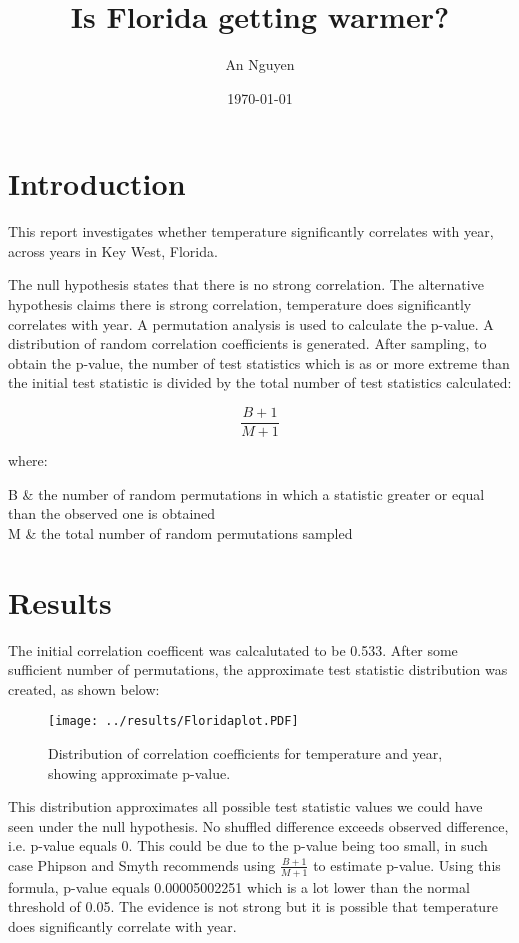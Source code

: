 \documentclass[12pt]{article}
\title{Is Florida getting warmer?}
\author{An Nguyen}
\date{\today}
\makeatletter
\newenvironment{conditions*}
  {\par\vspace{\abovedisplayskip}\noindent
   \tabularx{\columnwidth}{>{$}l<{$} @{${}={}$} >{\raggedright\arraybackslash}X}}
  {\endtabularx\par\vspace{\belowdisplayskip}}
\makeatother
\begin{document}
\maketitle

\section{Introduction}
This report investigates whether temperature significantly correlates with year, across years in Key West, Florida. 

The null hypothesis states that there is no strong correlation. The alternative hypothesis claims there is strong correlation, temperature does significantly correlates with year. A permutation analysis is used to calculate the p-value. A distribution of random correlation coefficients is generated. After sampling, to obtain the p-value, the number of test statistics which is as or more extreme than the initial test statistic is divided by the total number of test statistics calculated:

\begin{equation}
\frac{B+1}{M+1}
\end{equation}

where:
\begin{conditions*}
B    &  the number of random permutations in which a statistic greater or equal          than the observed one is obtained \\
M    &  the total number of random permutations sampled
\end{conditions*}

\section{Results}
The initial correlation coefficent was calcalutated to be 0.533. After some sufficient number of permutations, the approximate test statistic distribution was created, as shown below: 

\begin{figure}[H]
\texttt{[image: ../results/Floridaplot.PDF]}
\centering
\caption{Distribution of correlation coefficients for temperature and year, showing approximate p-value.}
\end{figure}

This distribution approximates all possible test statistic values we could have seen under the null hypothesis. No shuffled difference exceeds observed difference, i.e. p-value equals 0. This could be due to the p-value being too small, in such case Phipson and Smyth \cite{PhipsonSmyth+2010} recommends using $\frac{B+1}{M+1}$ to estimate p-value. Using this formula, p-value equals 0.00005002251 which is a lot lower than the normal threshold of 0.05. The evidence is not strong but it is possible that temperature does significantly correlate with year. 


  

\end{document}
